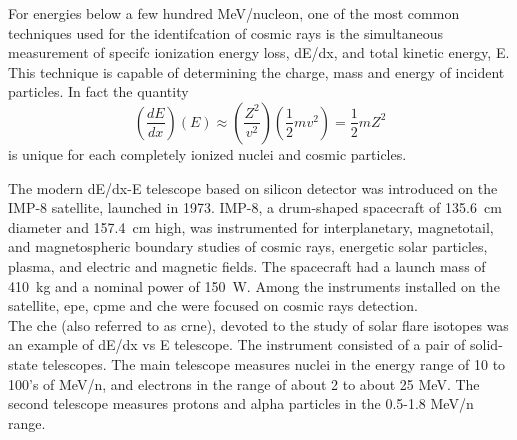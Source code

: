 
For energies below a few hundred MeV/nucleon, one of the most common techniques
used for the identifcation of cosmic rays is the simultaneous measurement of
specifc ionization energy loss, dE/dx, and total kinetic energy, E. This
technique is capable of determining the charge, mass and energy of incident
particles. In fact the quantity
\begin{equation}
  \left( \frac{dE}{dx} \right)\left( E \right) \approx \left( \frac{Z^2}{v^2} \right)\left( \frac{1}{2}mv^2 \right)= \frac{1}{2}mZ^2 
\end{equation}
is unique for each completely ionized nuclei and cosmic particles.

\hskip 1cm The modern dE/dx-E telescope based on silicon detector was introduced
on the IMP-8 satellite, launched in 1973. IMP-8, a drum-shaped spacecraft of
135.6~cm diameter and 157.4~cm high, was instrumented for interplanetary,
magnetotail, and magnetospheric boundary studies of cosmic rays, energetic solar
particles, plasma, and electric and magnetic fields. The spacecraft had a launch
mass of 410~kg and a nominal power of 150~W. Among the instruments installed
on the satellite, \gls{epe}, \gls{cpme} and \gls{che} were focused on cosmic rays detection.\\
The \gls{che} (also referred to as \gls{crne}), devoted to the study of solar
flare isotopes was an example of dE/dx vs E telescope. The instrument consisted
of a pair of solid-state telescopes. The main telescope measures nuclei in the
energy range of 10 to 100's of MeV/n, and electrons in the range of about 2 to
about 25 MeV. The second telescope measures protons and alpha particles in the
0.5-1.8 MeV/n range.

